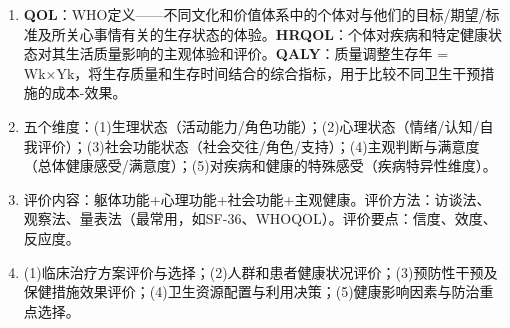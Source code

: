 \begin{enumerate}[leftmargin=*, itemsep=5pt]
    \item \textbf{QOL}：WHO定义——不同文化和价值体系中的个体对与他们的目标/期望/标准及所关心事情有关的生存状态的体验。\textbf{HRQOL}：个体对疾病和特定健康状态对其生活质量影响的主观体验和评价。\textbf{QALY}：质量调整生存年 = Wk×Yk，将生存质量和生存时间结合的综合指标，用于比较不同卫生干预措施的成本-效果。
    \item 五个维度：(1)生理状态（活动能力/角色功能）；(2)心理状态（情绪/认知/自我评价）；(3)社会功能状态（社会交往/角色/支持）；(4)主观判断与满意度（总体健康感受/满意度）；(5)对疾病和健康的特殊感受（疾病特异性维度）。
    \item 评价内容：躯体功能+心理功能+社会功能+主观健康。评价方法：访谈法、观察法、量表法（最常用，如SF-36、WHOQOL）。评价要点：信度、效度、反应度。
    \item (1)临床治疗方案评价与选择；(2)人群和患者健康状况评价；(3)预防性干预及保健措施效果评价；(4)卫生资源配置与利用决策；(5)健康影响因素与防治重点选择。
\end{enumerate}

\newpage
